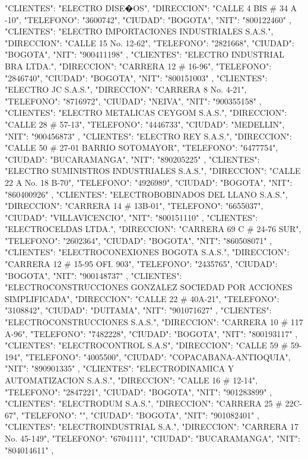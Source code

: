    {
   "CLIENTES": "ELECTRO DISE�OS",
   "DIRECCION": "CALLE 4 BIS # 34 A -10",
   "TELEFONO": "3600742",
   "CIUDAD": "BOGOTA",
   "NIT": "800122460"
   },
   {
   "CLIENTES": "ELECTRO IMPORTACIONES INDUSTRIALES S.A.S.",
   "DIRECCION": "CALLE 15 No. 12-62",
   "TELEFONO": "2821668",
   "CIUDAD": "BOGOTA",
   "NIT": "900411198"
   },
   {
   "CLIENTES": "ELECTRO INDUSTRIAL BRA LTDA.",
   "DIRECCION": "CARRERA 12 # 16-96",
   "TELEFONO": "2846740",
   "CIUDAD": "BOGOTA",
   "NIT": "800151003"
   },
   {
   "CLIENTES": "ELECTRO JC S.A.S.",
   "DIRECCION": "CARRERA 8 No. 4-21",
   "TELEFONO": "8716972",
   "CIUDAD": "NEIVA",
   "NIT": "900355158"
   },
   {
   "CLIENTES": "ELECTRO METALICAS CEYGOM S.A.S.",
   "DIRECCION": "CALLE 28 # 57-13",
   "TELEFONO": "4446733",
   "CIUDAD": "MEDELLIN",
   "NIT": "900456873"
   },
   {
   "CLIENTES": "ELECTRO REY S.A.S.",
   "DIRECCION": "CALLE 50 # 27-01 BARRIO SOTOMAYOR",
   "TELEFONO": "6477754",
   "CIUDAD": "BUCARAMANGA",
   "NIT": "890205225"
   },
   {
   "CLIENTES": "ELECTRO SUMINISTROS INDUSTRIALES S.A.S.",
   "DIRECCION": "CALLE 22 A No. 18 B-70",
   "TELEFONO": "4926989",
   "CIUDAD": "BOGOTA",
   "NIT": "860400926"
   },
   {
   "CLIENTES": "ELECTROBOBINADOS DEL LLANO S.A.S.",
   "DIRECCION": "CARRERA 14 # 13B-01",
   "TELEFONO": "6655037",
   "CIUDAD": "VILLAVICENCIO",
   "NIT": "800151110"
   },
   {
   "CLIENTES": "ELECTROCELDAS LTDA.",
   "DIRECCION": "CARRERA 69 C # 24-76 SUR",
   "TELEFONO": "2602364",
   "CIUDAD": "BOGOTA",
   "NIT": "860508071"
   },
   {
   "CLIENTES": "ELECTROCONEXIONES BOGOTA S.A.S.",
   "DIRECCION": "CARRERA 12 # 15-95 OFI. 903",
   "TELEFONO": "2435765",
   "CIUDAD": "BOGOTA",
   "NIT": "900148737"
   },
   {
   "CLIENTES": "ELECTROCONSTRUCCIONES GONZALEZ SOCIEDAD POR ACCIONES SIMPLIFICADA",
   "DIRECCION": "CALLE 22 # 40A-21",
   "TELEFONO": "3108842",
   "CIUDAD": "DUITAMA",
   "NIT": "901071627"
   },
   {
   "CLIENTES": "ELECTROCONSTRUCCIONES S.A.S.",
   "DIRECCION": "CARRERA 10 # 117 A-96",
   "TELEFONO": "7482228",
   "CIUDAD": "BOGOTA",
   "NIT": "800193117"
   },
   {
   "CLIENTES": "ELECTROCONTROL S.A.S",
   "DIRECCION": "CALLE 59 # 59-194",
   "TELEFONO": "4005500",
   "CIUDAD": "COPACABANA-ANTIOQUIA",
   "NIT": "890901335"
   },
   {
   "CLIENTES": "ELECTRODINAMICA Y AUTOMATIZACION S.A.S.",
   "DIRECCION": "CALLE 16 # 12-14",
   "TELEFONO": "2847221",
   "CIUDAD": "BOGOTA",
   "NIT": "901283899"
   },
   {
   "CLIENTES": "ELECTRODUM S.A.S.",
   "DIRECCION": "CARRERA 25 # 22C-67",
   "TELEFONO": "",
   "CIUDAD": "BOGOTA",
   "NIT": "901082401"
   },
   {
   "CLIENTES": "ELECTROINDUSTRIAL S.A.",
   "DIRECCION": "CARRERA 17 No. 45-149",
   "TELEFONO": "6704111",
   "CIUDAD": "BUCARAMANGA",
   "NIT": "804014611"
   },
